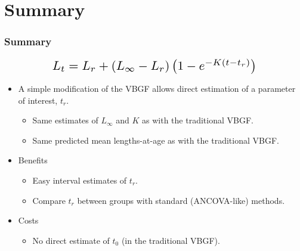 \documentclass[xcolor=dvipsnames]{beamer}\usepackage[]{graphicx}\usepackage[]{color}
\newcommand*{\Scale}[2][4]{\scalebox{#1}{\ensuremath{#2}}}%
\begin{document}
\section{Summary}

\begin{frame}[fragile, t]
\frametitle{Summary}
\vspace{-14pt}
\[\Scale[1.5]{ L_{t} = L_{r} + \left(L_{\infty}-L_{r}\right)\left(1-e^{-K(t-t_{r})}\right) }\]
\bigskip
\begin{itemize}
  \item A simple modification of the VBGF allows direct estimation of a parameter of interest, $t_{r}$.
  \begin{itemize}
    \item Same estimates of $L_{\infty}$ and $K$ as with the traditional VBGF.
    \item Same predicted mean lengths-at-age as with the traditional VBGF.
  \end{itemize}
  \pause
  \bigskip
  \item Benefits
  \begin{itemize}
    \item Easy interval estimates of $t_{r}$.
    \item Compare $t_{r}$ between groups with standard (ANCOVA-like) methods.
  \end{itemize}
  \pause
  \smallskip
  \item Costs
  \begin{itemize}
    \item No direct estimate of $t_{0}$ (in the traditional VBGF).
  \end{itemize}
\end{itemize}
\end{frame}


\end{document}
